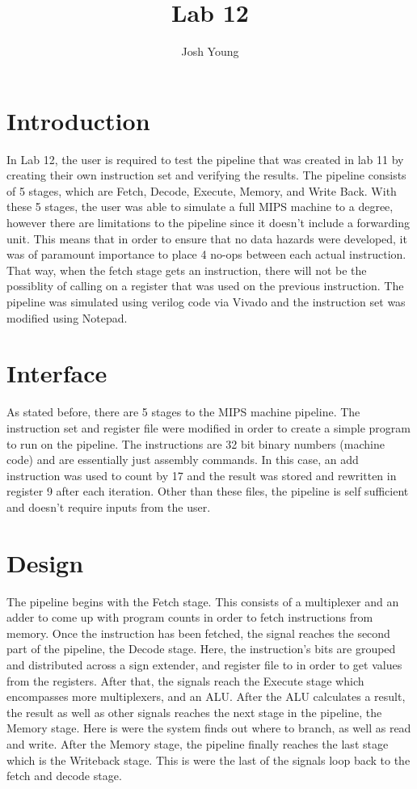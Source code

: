 \documentclass{article}
\author{Josh Young}
\title{Lab 12}
\begin{document}
\maketitle

\section{Introduction}
In Lab 12, the user is required to test the pipeline that was created in lab 11 by creating their own instruction set and verifying the results. The pipeline consists of 5 stages, which are Fetch, Decode, Execute, Memory, and Write Back. With these 5 stages, the user was able to simulate a full MIPS machine to a degree, however there are limitations to the pipeline since it doesn't include a forwarding unit. This means that in order to ensure that no data hazards were developed, it was of paramount importance to place 4 no-ops between each actual instruction. That way, when the fetch stage gets an instruction, there will not be the possiblity of calling on a register that was used on the previous instruction. The pipeline was simulated using verilog code via Vivado and the instruction set was modified using Notepad.

\section{Interface}
As stated before, there are 5 stages to the MIPS machine pipeline. The instruction set and register file were modified in order to create a simple program to run on the pipeline. The instructions are 32 bit binary numbers (machine code) and are essentially just assembly commands. In this case, an add instruction was used to count by 17 and the result was stored and rewritten in register 9 after each iteration. Other than these files, the pipeline is self sufficient and doesn't require inputs from the user. 

\section{Design}
The pipeline begins with the Fetch stage. This consists of a multiplexer and an adder to come up with program counts in order to fetch instructions from memory. Once the instruction has been fetched, the signal reaches the second part of the pipeline, the Decode stage. Here, the instruction's bits are grouped and distributed across a sign extender, and register file to in order to get values from the registers. After that, the signals reach the Execute stage which encompasses more multiplexers, and an ALU. After the ALU calculates a result, the result as well as other signals reaches the next stage in the pipeline, the Memory stage. Here is were the system finds out where to branch, as well as read and write. After the Memory stage, the pipeline finally reaches the last stage which is the Writeback stage. This is were the last of the signals loop back to the fetch and decode stage.
\end{document}
